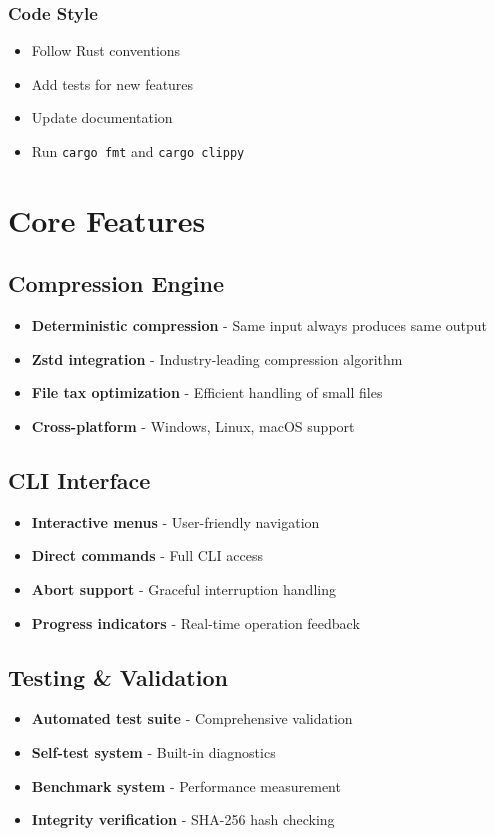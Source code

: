 \documentclass[11pt,a4paper]{article}
\begin{document}
	\subsubsection{Code Style}
	\begin{itemize}
		\item Follow Rust conventions
		\item Add tests for new features
		\item Update documentation
		\item Run \texttt{cargo fmt} and \texttt{cargo clippy}
	\end{itemize}

	\section{Core Features}
	\label{sec:features}

	\subsection{Compression Engine}
	\begin{itemize}
		\item \textbf{Deterministic compression} - Same input always produces same output
		\item \textbf{Zstd integration} - Industry-leading compression algorithm
		\item \textbf{File tax optimization} - Efficient handling of small files
		\item \textbf{Cross-platform} - Windows, Linux, macOS support
	\end{itemize}

	\subsection{CLI Interface}
	\begin{itemize}
		\item \textbf{Interactive menus} - User-friendly navigation
		\item \textbf{Direct commands} - Full CLI access
		\item \textbf{Abort support} - Graceful interruption handling
		\item \textbf{Progress indicators} - Real-time operation feedback
	\end{itemize}

	\subsection{Testing \& Validation}
	\begin{itemize}
		\item \textbf{Automated test suite} - Comprehensive validation
		\item \textbf{Self-test system} - Built-in diagnostics
		\item \textbf{Benchmark system} - Performance measurement
		\item \textbf{Integrity verification} - SHA-256 hash checking
	\end{itemize}
\end{document}
